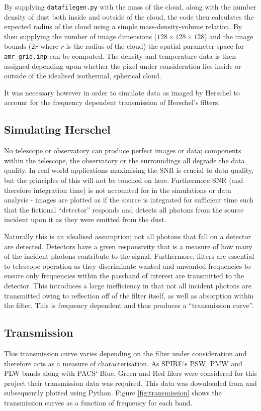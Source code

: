 \documentclass{report}
\begin{document}
By supplying \texttt{datafilegen.py} with the mass of the cloud, along with the number density of dust both inside and outside of the cloud, the code then calculates the expected radius of the cloud using a simple mass-density-volume relation. By then supplying the number of image dimensions ($128\times128\times128$) and the image bounds ($2r$ where $r$ is the radius of the cloud) the spatial parameter space for \texttt{amr\_grid.inp} can be computed. The density and temperature data is then assigned depending upon whether the pixel under consideration lies inside or outside of the idealised isothermal, spherical cloud.

It was necessary however in order to simulate data as imaged by Herschel to account for the frequency dependent transmission of Herschel's filters.

\subsection{Simulating Herschel}
No telescope or observatory can produce perfect images or data; components within the telescope, the observatory or the surroundings all degrade the data quality. In real world applications maximising the SNR is crucial to data quality, but the principles of this will not be touched on here. Furthermore SNR (and therefore integration time) is not accounted for in the simulations or data analysis - images are plotted as if the source is integrated for sufficient time such that the fictional ``detector'' responds and detects all photons from the source incident upon it as they were emitted from the dust.

Naturally this is an idealised assumption; not all photons that fall on a detector are detected. Detectors have a given responsivity that is a measure of how many of the incident photons contribute to the signal. Furthermore, filters are essential to telescope operation as they discriminate wanted and unwanted frequencies to ensure only frequencies within the passband of interest are transmitted to the detector. This introduces a large inefficiency in that not all incident photons are transmitted owing to reflection off of the filter itself, as well as absorption within the filter. This is frequency dependent and thus produces a ``transmission curve''.

\subsection{Transmission}
This transmission curve varies depending on the filter under consideration and therefore acts as a measure of characterisation. As SPIRE`s PSW, PMW and PLW bands along with PACS` Blue, Green and Red filers were considered for this project their transmission data was required. This data was downloaded from \textcite{pass} and subsequently plotted using Python. Figure \ref{fig:transmission} shows the transmission curves as a function of frequency for each band.
\end{document}
